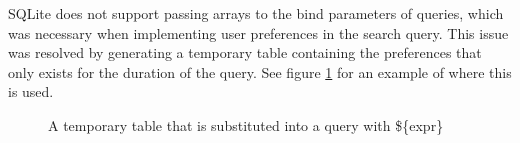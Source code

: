 SQLite does not support passing arrays to the bind parameters of queries, which was
necessary when implementing user preferences in the search query. This issue
was resolved by generating a temporary table containing the preferences
that only exists for the duration of the query. See figure \ref{fig:temp_table_substitution}
for an example of where this is used.

\begin{figure}[h]
    \caption{\label{fig:temp_table_substitution}A temporary table that is substituted into a query with \$\{expr\}}
    \raggedright

\end{figure}
